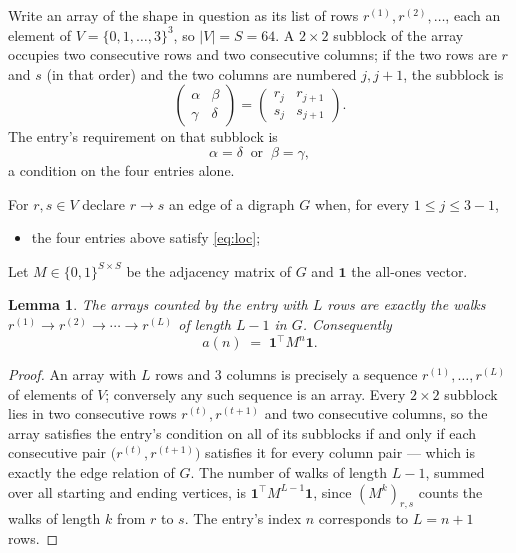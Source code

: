 \documentclass[11pt,a4paper]{article}
\theoremstyle{plain}
\newtheorem{lemma}[theorem]{Lemma}
\theoremstyle{definition}
\begin{document}
Write an array of the shape in question as its list of rows
$r^{(1)},r^{(2)},\dots$, each an element of
$V=\{0,1,\dots,3\}^{3}$, so $|V|=S=64$. A $2\times2$ subblock of the array
occupies two consecutive rows and two consecutive columns; if the two rows are $r$
and $s$ (in that order) and the two columns are numbered $j,j+1$,
the subblock is
\[
\begin{pmatrix}\alpha&\beta\\\gamma&\delta\end{pmatrix}=\begin{pmatrix}r_j&r_{j+1}\\s_j&s_{j+1}\end{pmatrix}.
\]
The entry's requirement on that subblock is
\begin{equation}\label{eq:loc}
\alpha=\delta\ \text{ or }\ \beta=\gamma,
\end{equation}
a condition on the four entries alone.

For $r,s\in V$ declare $r\to s$ an edge of a digraph $G$ when, for every
$1\le j\le 3-1$,
\begin{itemize}
\item the four entries above satisfy \eqref{eq:loc};

\end{itemize}
Let $M\in\{0,1\}^{S\times S}$ be the adjacency matrix of $G$ and $\mathbf{1}$ the
all-ones vector.

\begin{lemma}\label{lem:walk}
The arrays counted by the entry with $L$ rows are exactly the walks
$r^{(1)}\to r^{(2)}\to\cdots\to r^{(L)}$ of length $L-1$ in $G$. Consequently
\[
a(n)\;=\;\mathbf{1}^{\!\top}M^{n}\mathbf{1} .
\]
\end{lemma}

\begin{proof}
An array with $L$ rows and $3$ columns is precisely a sequence
$r^{(1)},\dots,r^{(L)}$ of elements of $V$; conversely any such sequence is an array.
Every $2\times2$ subblock lies in two consecutive rows $r^{(t)},r^{(t+1)}$ and two
consecutive columns, so the array satisfies the entry's condition on all of its subblocks
if and only if each consecutive pair $\bigl(r^{(t)},r^{(t+1)}\bigr)$ satisfies it for
every column pair --- which is exactly the edge relation of $G$. The number of walks of
length $L-1$, summed over all starting and ending vertices, is
$\mathbf{1}^{\!\top}M^{L-1}\mathbf{1}$, since $(M^{k})_{r,s}$ counts the walks of
length $k$ from $r$ to $s$. The entry's index $n$ corresponds to $L=n+1$ rows.
\end{proof}
\end{document}

